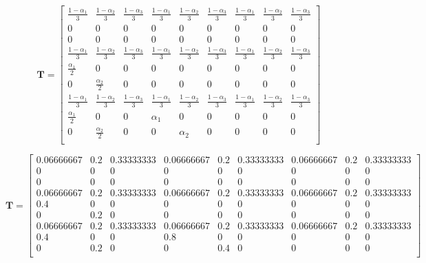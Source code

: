 \documentclass{article}
\begin{document}
\[\mathbf{T}=
\begin{bmatrix}
    \frac{1-\alpha_1}{3} &  \frac{1-\alpha_2}{3} & \frac{1-\alpha_3}{3} & \frac{1-\alpha_1}{3} &  \frac{1-\alpha_2}{3} & \frac{1-\alpha_3}{3} & \frac{1-\alpha_1}{3} &  \frac{1-\alpha_2}{3} & \frac{1-\alpha_3}{3} \\
    0 & 0 & 0 &  0 & 0 & 0 & 0 & 0 & 0 \\
    0 & 0 & 0 & 0 & 0 & 0 & 0 & 0 & 0 \\
        \frac{1-\alpha_1}{3} &  \frac{1-\alpha_2}{3} & \frac{1-\alpha_3}{3} & \frac{1-\alpha_1}{3} &  \frac{1-\alpha_2}{3} & \frac{1-\alpha_3}{3} & \frac{1-\alpha_1}{3} &  \frac{1-\alpha_2}{3} & \frac{1-\alpha_3}{3} \\
	    \frac{\alpha_1}{2} & 0 & 0 & 0 & 0 & 0 & 0 & 0 & 0 \\
	   0 & \frac{\alpha_2}{2} & 0 & 0 & 0 & 0 & 0 & 0 & 0 \\
        \frac{1-\alpha_1}{3} &  \frac{1-\alpha_2}{3} & \frac{1-\alpha_3}{3} & \frac{1-\alpha_1}{3} &  \frac{1-\alpha_2}{3} & \frac{1-\alpha_3}{3} & \frac{1-\alpha_1}{3} &  \frac{1-\alpha_2}{3} & \frac{1-\alpha_3}{3} \\
		   \frac{\alpha_1}{2} & 0 & 0 & \alpha_1 & 0 & 0 & 0 & 0 & 0 \\
		  0 & \frac{\alpha_2}{2} & 0 & 0 & \alpha_2 & 0 & 0 & 0 & 0 \\

\end{bmatrix}
\]


\[\mathbf{T}=
\begin{bmatrix}
    0.06666667 & 0.2 & 0.33333333 &  0.06666667 &  0.2 & 0.33333333 & 0.06666667 & 0.2 & 0.33333333 \\
    0 & 0 & 0 & 0 & 0 & 0 & 0 & 0 & 0 \\
    0 & 0 & 0 & 0 & 0 & 0 & 0 & 0 & 0 \\
       0.06666667 & 0.2 & 0.33333333 &  0.06666667 &  0.2 & 0.33333333 & 0.06666667 & 0.2 & 0.33333333 \\
	   0.4 & 0 & 0 & 0 & 0 & 0 & 0 & 0 & 0 \\
	   0 & 0.2 & 0 & 0 & 0 & 0 & 0 & 0 & 0 \\
       0.06666667 & 0.2 & 0.33333333 &  0.06666667 &  0.2 & 0.33333333 & 0.06666667 & 0.2 & 0.33333333 \\
		  0.4 & 0 & 0 & 0.8 & 0 & 0 & 0 & 0 & 0 \\
		  0 & 0.2 & 0 & 0 &0.4 & 0 & 0 & 0 & 0 \\

\end{bmatrix}
\]
\end{document}
